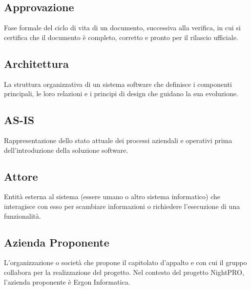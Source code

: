 \documentclass[a4paper, 11pt, oneside]{scrartcl} %
\begin{document}
\subsection*{Approvazione}


Fase formale del ciclo di vita di un documento, successiva alla verifica, in cui si certifica che il documento è completo, corretto e pronto per il rilascio ufficiale.

\vspace{0.5cm}

\subsection*{Architettura}


La struttura organizzativa di un sistema software che definisce i componenti principali, le loro relazioni e i principi di design che guidano la sua evoluzione.

\vspace{0.5cm}

\subsection*{AS-IS}
Rappresentazione dello stato attuale dei processi aziendali e operativi prima dell'introduzione della soluzione software.
\vspace{0.5cm}

\subsection*{Attore}
Entità esterna al sistema (essere umano o altro sistema informatico) che interagisce con esso per scambiare informazioni o richiedere l'esecuzione di una funzionalità.
\vspace{0.5cm}

\subsection*{Azienda Proponente}


L'organizzazione o società che propone il capitolato d'appalto e con cui il gruppo collabora per la realizzazione del progetto. Nel contesto del progetto NightPRO, l'azienda proponente è Ergon Informatica.
\end{document}
